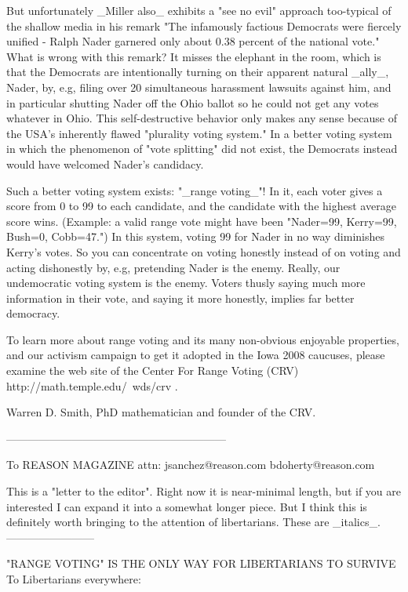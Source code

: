 But unfortunately _Miller also_ exhibits a "see no evil" approach
too-typical of the shallow media in his remark
"The infamously factious Democrats were fiercely unified -
Ralph Nader garnered only about 0.38 percent of the national vote."
What is wrong with this remark?  It misses the elephant in the room, which is
that the Democrats are intentionally turning on their apparent natural _ally_, Nader,
by, e.g, filing over 20 simultaneous harassment lawsuits against him, and in particular 
shutting Nader off the Ohio ballot so he could not get any votes whatever in Ohio.
This self-destructive behavior only makes any sense because of the USA's
inherently flawed "plurality voting system."  In a better voting system in
which the phenomenon of "vote splitting" did not exist, the Democrats instead would
have welcomed Nader's candidacy.

Such a better voting system exists: "_range voting_"!
In it, each voter gives a score from 0 to 99 to each candidate, and the candidate with
the highest average score wins.  (Example: a valid range vote might have been 
"Nader=99, Kerry=99, Bush=0, Cobb=47.")  In this system, voting 99 for Nader in no
way diminishes Kerry's votes.  So you can concentrate on voting honestly instead of
on voting and acting dishonestly by, e.g, pretending Nader is the enemy.  Really,
our undemocratic voting system is the enemy.  Voters thusly saying much more
information in their vote, and saying it more honestly, implies far better democracy.

To learn more about range voting and its many non-obvious enjoyable properties, 
and our activism campaign to get it adopted in the Iowa 2008 caucuses,
please examine the web site of the Center For Range Voting (CRV)
   http://math.temple.edu/~wds/crv .

Warren D. Smith,  PhD mathematician and founder of the CRV.

------------------------------------------------------------

To REASON MAGAZINE
attn: 
jsanchez@reason.com bdoherty@reason.com


This is a "letter to the editor".  Right now it is near-minimal length, but if you are
interested I can expand it into a somewhat longer piece.  But I think this is definitely 
worth bringing to the attention of libertarians.  These are _italics_.
------------------------

"RANGE VOTING" IS THE ONLY WAY FOR LIBERTARIANS TO SURVIVE
To Libertarians everywhere:

